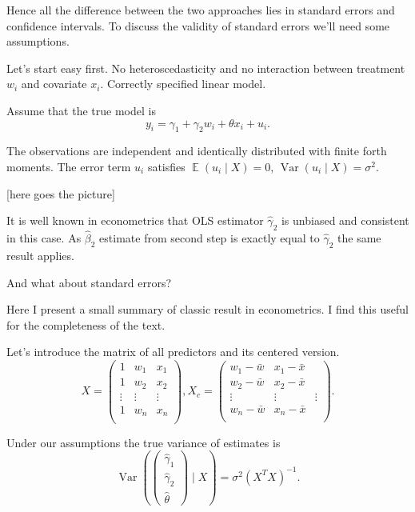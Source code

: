 \documentclass[10pt, a4paper]{article}
\DeclareMathOperator{\Var}{Var}
\DeclareMathOperator{\E}{\mathbb{E}}
\begin{document}
Hence all the difference between the two approaches lies in standard errors and confidence intervals.
To discuss the validity of standard errors we'll need some assumptions.


Let's start easy first. No heteroscedasticity and no interaction between treatment $w_i$ and covariate $x_i$.
Correctly specified linear model. 

Assume that the true model is 
\[
y_i = \gamma_1 + \gamma_2 w_i + \theta x_i + u_i.
\]

The observations are independent and identically distributed with finite forth moments. 
The error term $u_i$ satisfies $\E(u_i \mid X) = 0$, $\Var(u_i \mid X) = \sigma^2$.

[here goes the picture]


It is well known in econometrics that OLS estimator $\hat\gamma_2$ is unbiased and consistent in this case.
As $\hat\beta_2$ estimate from second step is exactly equal to $\hat\gamma_2$ the same result applies.

And what about standard errors?

Here I present a small summary of classic result in econometrics. 
I find this useful for the completeness of the text. 

Let's introduce the matrix of all predictors and its centered version.
\[
X = \begin{pmatrix}
    1 & w_1 & x_1 \\
    1 & w_2 & x_2 \\
    \vdots & \vdots & \vdots \\
    1 & w_n & x_n \\
\end{pmatrix},
X_c = \begin{pmatrix}
    w_1 - \bar w & x_1 - \bar x \\
    w_2 - \bar w & x_2 - \bar x\\
    \vdots & \vdots & \vdots \\
    w_n - \bar w& x_n  - \bar x \\
\end{pmatrix}.    
\]


Under our assumptions the true variance of estimates is
\[
\Var\left( 
\begin{pmatrix}    
    \hat \gamma_1 \\
    \hat \gamma_2 \\
    \hat \theta
\end{pmatrix}
\mid X \right) = \sigma^2 (X^TX)^{-1}.
\]
\end{document}
